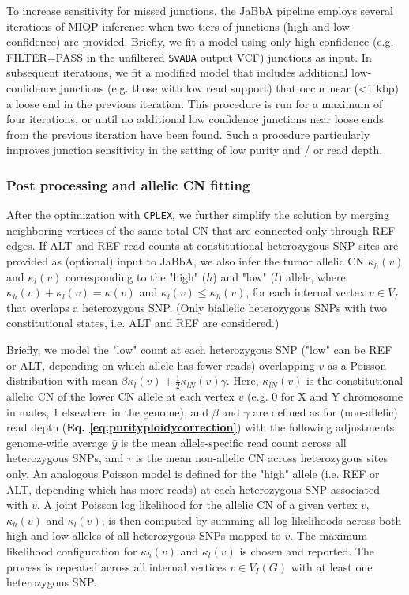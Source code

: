 \documentclass[phd,tocprelim]{cornell}
\begin{document}
To increase sensitivity for missed junctions, the JaBbA pipeline employs several iterations of MIQP inference when two tiers of junctions (high and low confidence) are provided.  Briefly, we fit a model using only high-confidence (e.g. FILTER=PASS in the unfiltered \texttt{SvABA} output VCF) junctions as input.  In subsequent iterations, we fit a modified model that includes additional low-confidence junctions (e.g. those with low read support) that occur near (<1 kbp) a loose end in the previous iteration.  This procedure is run for a maximum of four iterations, or until no additional low confidence junctions near loose ends from the previous iteration have been found.   Such a procedure particularly improves junction sensitivity in the setting of low purity and / or read depth.



\subsubsection*{Post processing and allelic CN fitting}
After the optimization with \texttt{CPLEX}, we further simplify the solution by merging neighboring vertices of the same total CN that are connected only through REF edges. If ALT and REF read counts at constitutional heterozygous SNP sites are provided as (optional) input to JaBbA, we also infer the tumor allelic CN $\kappa_{h}(v)$ and  $\kappa_{l}(v)$ corresponding to the "high" ($h$) and "low" ($l$) allele, where  $\kappa_{h}(v) + \kappa_{l}(v) = \kappa(v)$ and $\kappa_{l}(v) \le \kappa_{h}(v)$, for each internal vertex $v \in V_I$ that overlaps a heterozygous SNP.  (Only biallelic heterozygous SNPs with two constitutional states, i.e. ALT and REF are considered.)

Briefly, we model the "low" count at each heterozygous SNP ("low" can be REF or ALT, depending on which allele has fewer reads) overlapping $v$ as a Poisson distribution with mean $\beta\kappa_l(v) + \frac{1}{2}\kappa_{lN}(v)\gamma$.  Here, $\kappa_{lN}(v)$ is the constitutional allelic CN of the lower CN allele at each vertex $v$ (e.g. 0 for X and Y chromosome in males, 1 elsewhere in the genome), and $\beta$ and $\gamma$ are defined as for (non-allelic) read depth (\textbf{Eq. \ref{eq:purityploidycorrection}}) with the following adjustments: genome-wide average $\bar{y}$ is the mean allele-specific read count across all heterozygous SNPs, and $\tau$ is the mean non-allelic CN across heterozygous sites only. An analogous Poisson model is defined for the "high" allele (i.e. REF or ALT, depending which has more reads) at each heterozygous SNP associated with $v$.  A joint Poisson log likelihood for the allelic CN of a given vertex $v$, $\kappa_{h}(v)$ and $\kappa_{l}(v)$, is then computed by summing all log likelihoods across both high and low alleles of all heterozygous SNPs mapped to $v$. The maximum likelihood configuration for $\kappa_{h}(v)$ and $\kappa_{l}(v)$ is chosen and reported.  The process is repeated across all internal vertices $v \in V_I(G)$ with at least one heterozygous SNP.
\end{document}
